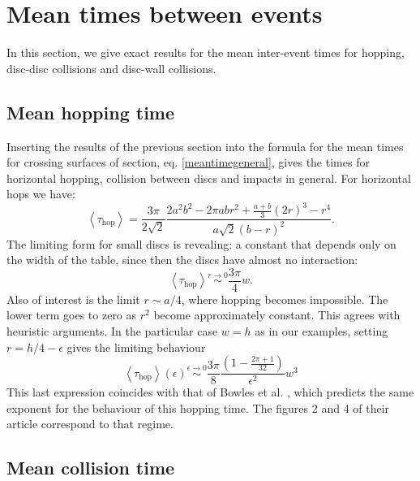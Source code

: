 \documentclass[superscriptaddress,pre,reprint,showpacs,onecolumn]{revtex4-1}
\newcommand{\mean}[1]{\left \langle #1 \right \rangle}
\begin{document}
\section{Mean times between events}

In this section, we give exact results for the mean inter-event times for hopping, disc-disc collisions and disc-wall collisions.

\subsection{Mean hopping time}

Inserting the results of the previous section 
into the formula for the mean times for crossing
surfaces of section, eq. \ref{meantimegeneral}, gives the times for 
horizontal hopping, 
collision between discs and impacts in general. For horizontal
hops we have:
\begin{equation}\label{hoptau}
 \mean{\tau_\text{hop}} = 	
\frac{3 \pi}{2\sqrt{2}}
\frac{2 a^{2} b^{2}  - 2 \pi a b r^{2} + \textstyle \frac{a+b}{3}  (2r)^{3}  -  r^4}
{ a \sqrt{2}  ( b - r )^2}.
\end{equation}
The limiting form for small discs is revealing: a constant
that depends only on the width of the table, since then the discs have almost no interaction:
\begin{equation}\label{hoptaulimit}
 \mean{\tau_\text{hop}} \overset{r \to 0}{\sim}
\frac{3 \pi}{4}w.
\end{equation}
Also of interest is the limit $r\sim a/4$, where hopping becomes
impossible. The lower term goes to zero as $r^2$ become approximately constant.
This agrees with heuristic arguments. 
In the particular case $w=h$ as in our examples,
setting $r=h/4-\epsilon$ gives the limiting behaviour 
\begin{equation}
 \mean{\tau_\text{hop}}(\epsilon) \overset{\epsilon \to 0}{\sim}
\frac{3 \pi}{8}
\frac{(1-\frac{2\pi+1}{32})}
{ \epsilon^2} w^3
\end{equation} 
This last expression coincides with that of Bowles et al. \cite[Equation~12]{Bowles04},
which
predicts the same exponent for the behaviour of this hopping time. The figures
2 and 4 of their article correspond to that regime. 

\subsection{Mean collision time}
\end{document}
